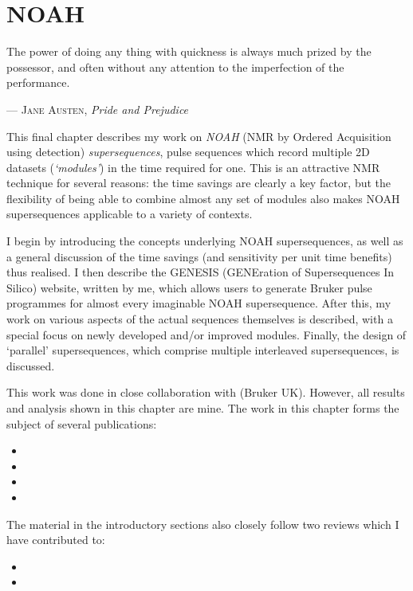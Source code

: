 \chapter{NOAH}
\label{chpt:noah}

\epigraph{\singlespacing%
The power of doing any thing with quickness is always much prized by the possessor, and often without any attention to the imperfection of the performance.%
}{--- \textsc{Jane Austen}, \textit{Pride and Prejudice}}

This final chapter describes my work on \textit{NOAH} (NMR by Ordered Acquisition using \proton{} detection) \textit{supersequences}, pulse sequences which record multiple 2D datasets (\textit{`modules'}) in the time required for one.
This is an attractive NMR technique for several reasons: the time savings are clearly a key factor, but the flexibility of being able to combine almost any set of modules also makes NOAH supersequences applicable to a variety of contexts.

I begin by introducing the concepts underlying NOAH supersequences, as well as a general discussion of the time savings (and sensitivity per unit time benefits) thus realised.
I then describe the GENESIS (GENEration of Supersequences In Silico) website, written by me, which allows users to generate Bruker pulse programmes for almost every imaginable NOAH supersequence.
After this, my work on various aspects of the actual sequences themselves is described, with a special focus on newly developed and/or improved modules.
Finally, the design of `parallel' supersequences, which comprise multiple interleaved supersequences, is discussed.

This work was done in close collaboration with \EK{} (Bruker UK).
However, all results and analysis shown in this chapter are mine.
The work in this chapter forms the subject of several publications:

\begin{itemize}
    \item {}
    \item {}
    \item {}
    \item {}
\end{itemize}

The material in the introductory sections also closely follow two reviews which I have contributed to:
\begin{itemize}
    \item {}
    \item {}
\end{itemize}

\clearpage









\printbibliography[heading=subbibnumbered]{}
